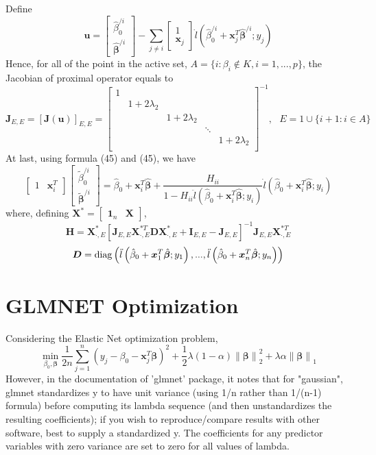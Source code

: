 \documentclass[letter]{article}
\newcommand{\norm}[1]{\left\lVert#1\right\rVert}
\begin{document}
	Define 
	$$\bm{u}=\begin{bmatrix}
	\hat{\beta}_0^{/i} \\
	\hat{\bm{\beta}}^{/i}\end{bmatrix}-
	\sum_{j\neq i}\begin{bmatrix}
	1 \\
	\bm{x}_j\end{bmatrix}
	\dot{l}\left(\hat{\beta}_0^{/i}+\bm{x}_j^T\hat{\bm{\beta}}^{/i};y_j\right)$$
	Hence, for all of the point in the active set, $A=\{i:\beta_i\not\in K,i=1,...,p\}$, the Jacobian of proximal operator equals to 
	$$\bm{J}_{E,E}=
	\left[\bm{J}(\bm{u})\right]_{E,E}=
	\begin{bmatrix}
	1 & & & & \\
	& 1+2\lambda_2 & & \\
	& & 1+2\lambda_2 & \\
	& & & \ddots & \\
	& & & & 1+2\lambda_2\\
	\end{bmatrix}^{-1},\ \ \ E={1}\cup \{i+1:i\in A\}$$
	At last, using formula (45) and (45), we have
	$$\begin{bmatrix}
	1 & \bm{x}_i^T\end{bmatrix}
	\begin{bmatrix}
	\tilde{\beta}_0^{/i} \\
	\tilde{\bm{\beta}}^{/i}\end{bmatrix}=
	\hat{\beta}_0+\bm{x}_i^T\hat{\bm{\beta}}+\frac{H_{ii}}{1-H_{ii}\ddot{l}\left(\hat{\beta}_0+\bm{x}_i^T\hat{\bm{\beta}};y_i\right)}\dot{l}\left(\hat{\beta}_0+\bm{x}_i^T\hat{\bm{\beta}};y_i\right)$$
	where, defining $\bm{X}^*=\begin{bmatrix}\bm{1}_n & \bm{X}\end{bmatrix}$, 
	$$\bm{H}=\bm{X}_{\cdot,E}^*
	\left[\bm{J}_{E,E}\bm{X}_{\cdot,E}^{*T}\bm{D}\bm{X}_{\cdot,E}^*+\bm{I}_{E,E}-\bm{J}_{E,E}\right]^{-1}
	\bm{J}_{E,E}\bm{X}_{\cdot,E}^{*T}$$
	$$\bm{D}={\rm diag}\left(\ddot{l}\left(\hat{\beta}_0+\bm{x}_1^T\hat{\bm{\beta}};y_1\right),...,\ddot{l}\left(\hat{\beta}_0+\bm{x}_n^T\hat{\bm{\beta}};y_n\right)\right)$$
	
	\section{GLMNET Optimization}
	
	Considering the Elastic Net optimization problem, 
	$$\min_{\beta_0,\bm{\beta}}\frac{1}{2n}\sum_{j=1}^{n}\left(y_j-\beta_0-\bm{x}_j^T\bm{\beta}\right)^2+\frac{1}{2}\lambda(1-\alpha)\norm{\bm{\beta}}_2^2+\lambda\alpha\norm{\bm{\beta}}_1$$
	However, in the documentation of 'glmnet' package, it notes that for "gaussian", glmnet standardizes y to have unit variance (using 1/n rather than 1/(n-1) formula) before computing its lambda sequence (and then unstandardizes the resulting coefficients); if you wish to reproduce/compare results with other software, best to supply a standardized y. The coefficients for any predictor variables with zero variance are set to zero for all values of lambda.	\\
	
\end{document}
